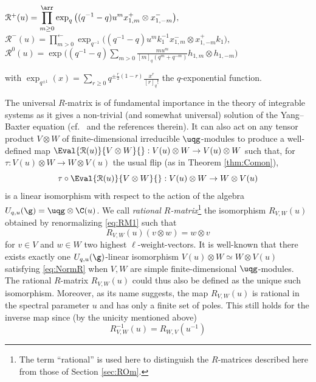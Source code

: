 \documentclass[11pt]{amsart}
\theoremstyle{definition}
\theoremstyle{remark}
\numberwithin{equation}{section}
\begin{document}
\begin{center}
$\mathcal{R}^+(u) = \displaystyle \prod_{m\geq 0}^{\arr}\exp_q\big((q^{-1}-q)u^m x_{1,m}^+\otimes x_{1,-m}^-\big),$\\
$\mathcal{R}^-(u) = \displaystyle \prod_{m > 0}^{\leftarrow}\exp_{q^{-1}}\big((q^{-1}-q)u^mk_1^{-1}x_{1,m}^-\otimes x_{1,-m}^+k_1\big),$\\
$\mathcal{R}^0(u) = \displaystyle \exp\Big((q^{-1}-q)\sum_{m>0}\frac{mu^m}{[m]_q(q^m+q^{-m})}h_{1,m}\otimes h_{1,-m}\Big)$
 \end{center}
with $\exp_{q^{\pm 1}}(x) = \sum_{r\geq 0}q^{\pm \frac{r}{2}(1-r)}\frac{x^r}{[r]_q!}$ the $q$-exponential function.\par
The universal $R$-matrix is of fundamental importance in the theory of integrable systems as it gives a non-trivial (and somewhat universal) solution of the Yang--Baxter equation (cf.~\cite{hbourb} and the references therein). It can also act on any tensor product $V\otimes W$ of finite-dimensional irreducible $\uqg$-modules to produce a well-defined map $\Eval{\mathcal{R}(u)}{V\otimes W}{}:V(u)\otimes W\rightarrow V(u)\otimes W$ such that, for $\tau : V(u)\otimes W \rightarrow W\otimes V(u)$ the usual flip (as in Theorem \ref{thm:Comon}), 
\begin{equation}\label{eq:RM1} 
\tau\circ\Eval{\mathcal{R}(u)}{V\otimes W}{} : V(u)\otimes W \rightarrow W\otimes V(u)
\end{equation}
is a linear isomorphism with respect to the action of the algebra $U_{q,u}(\g) = \uqg \otimes \C(u)$. We call \textit{rational $R$-matrix}\footnote{The term ``rational'' is used here to distinguish the $R$-matrices described here from those of Section \ref{sec:ROm}.} the isomorphism $ R_{V,W}(u) $ obtained by renormalizing \eqref{eq:RM1} such that 
\begin{equation}\label{eq:NormR}
 R_{V,W}(u)(v\otimes w) = w\otimes v
 \end{equation}
for $v\in V$ and $w\in W$ two highest $\ell$-weight-vectors. It is well-known that there exists exactly one $U_{q,u}(\g)$-linear isomorphism $V(u)\otimes W\simeq W\otimes V(u)$ satisfying \eqref{eq:NormR} when $V,W$ are simple finite-dimensional $\uqg$-modules. The rational $R$-matrix $R_{V,W}(u)$ could thus also be defined as the unique such isomorphism. Moreover, as its name suggests, the map $R_{V,W}(u)$ is rational in the spectral parameter $u$ and has only a finite set of poles. This still holds for the inverse map since (by the unicity mentioned above)
\begin{equation}\label{eq:RInv} R_{V,W}^{-1}(u) = R_{W,V}(u^{-1})
\end{equation}
\end{document}
